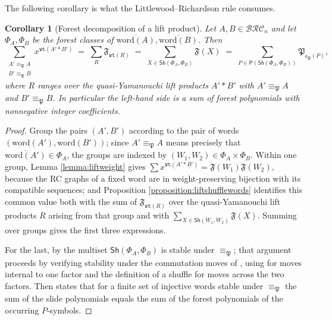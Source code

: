 \documentclass{amsart}
\newtheorem{corollary}[lemma]{Corollary}
\theoremstyle{definition}
\theoremstyle{remark}
\numberwithin{equation}{subsection}
\newcommand{\wtt}{\mathtt{wt}}
\newcommand{\BRC}{\mathcal{BRC}}
\newcommand{\code}{\mathfrak{c}}
\newcommand{\forest}{\mathfrak{P}}
\begin{document}
The following corollary is what the Littlewood--Richardson rule consumes.

\begin{corollary}[Forest decomposition of a lift product]\label{corollary:liftforestdecomp}
Let $A,B\in\BRC_n$ and let $\Phi_A,\Phi_B$ be the forest classes of $\overline{\mathrm{word}(A)},\overline{\mathrm{word}(B)}$. Then
$$\sum_{\substack{A'\equiv_\forest A\\ B'\equiv_\forest B}}x^{\wtt(A'*B')}\;=\;\sum_{R}\mathfrak{F}_{\wtt(R)}\;=\;\sum_{X\in\mathsf{Sh}(\Phi_A,\Phi_B)}\mathfrak{F}(X)\;=\;\sum_{P\in\mathsf{P}(\mathsf{Sh}(\Phi_A,\Phi_B))}\forest_{\code_\forest(P)},$$
where $R$ ranges over the quasi-Yamanouchi lift products $A'*B'$ with $A'\equiv_\forest A$ and $B'\equiv_\forest B$. In particular the left-hand side is a sum of forest polynomials with nonnegative integer coefficients.
\end{corollary}
\begin{proof}
Group the pairs $(A',B')$ according to the pair of words $(\mathrm{word}(A'),\mathrm{word}(B'))$; since $A'\equiv_\forest A$ means precisely that $\overline{\mathrm{word}(A')}\in\Phi_A$, the groups are indexed by $(W_1,W_2)\in\Phi_A\times\Phi_B$. Within one group, Lemma \ref{lemma:liftweight} gives $\sum x^{\wtt(A'*B')}=\mathfrak{F}(W_1)\mathfrak{F}(W_2)$, because the RC graphs of a fixed word are in weight-preserving bijection with its compatible sequences; and Proposition \ref{proposition:liftshufflewords} identifies this common value both with the sum of $\mathfrak{F}_{\wtt(R)}$ over the quasi-Yamanouchi lift products $R$ arising from that group and with $\sum_{X\in\mathsf{Sh}(W_1,W_2)}\mathfrak{F}(X)$. Summing over groups gives the first three expressions.

For the last, by \cite[Theorem~6.3]{nadeau2024forest} the multiset $\mathsf{Sh}(\Phi_A,\Phi_B)$ is stable under $\equiv_\forest$; that argument proceeds by verifying stability under the commutation moves of \cite[Proposition~5.8]{nadeau2024forest}, using \cite[Lemma~5.9]{nadeau2024forest} for moves internal to one factor and the definition of a shuffle for moves across the two factors. Then \cite[Proposition~5.10]{nadeau2024forest} states that for a finite set of injective words stable under $\equiv_\forest$ the sum of the slide polynomials equals the sum of the forest polynomials of the occurring $P$-symbols.
\end{proof}
\end{document}
